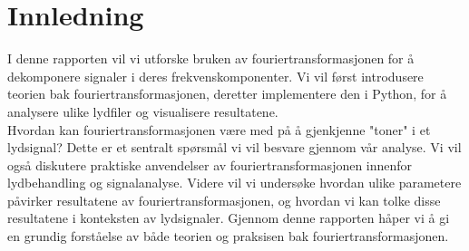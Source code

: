 \section{Innledning}
I denne rapporten vil vi utforske bruken av fouriertransformasjonen for å dekomponere signaler i deres frekvenskomponenter. Vi vil først introdusere teorien bak fouriertransformasjonen, deretter implementere den i Python, for å analysere ulike lydfiler og visualisere resultatene. \\ Hvordan kan fouriertransformasjonen være med på å gjenkjenne "toner" i et lydsignal? Dette er et sentralt spørsmål vi vil besvare gjennom vår analyse. Vi vil også diskutere praktiske anvendelser av fouriertransformasjonen innenfor lydbehandling og signalanalyse. Videre vil vi undersøke hvordan ulike parametere påvirker resultatene av fouriertransformasjonen, og hvordan vi kan tolke disse resultatene i konteksten av lydsignaler. Gjennom denne rapporten håper vi å gi en grundig forståelse av både teorien og praksisen bak fouriertransformasjonen.
